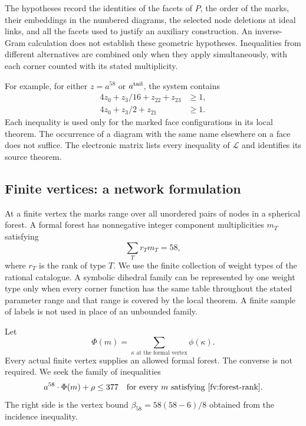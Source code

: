 \documentclass[11pt]{article}
\theoremstyle{definition}
\theoremstyle{remark}
\numberwithin{equation}{section}
\begin{document}
The hypotheses record the identities of the facets of $P$, the order
of the marks, their embeddings in the numbered diagrams, the selected
node deletions at ideal links, and all the facets used to justify an
auxiliary construction. An inverse-Gram calculation does not establish
these geometric hypotheses. Inequalities from different alternatives
are combined only when they apply simultaneously, with each corner
counted with its stated multiplicity.

For example, for either $z=a^{58}$ or $a^{\rm tail}$, the system
contains
\begin{align}
 4z_0+z_3/16+z_{22}+z_{23}&\ge1,
       \label{fv:example-face-P}\\
 4z_0+z_3/2+z_{21}&\ge1.
       \label{fv:example-face-M}
\end{align}
Each inequality is used only for the marked face configurations in
its local theorem. The occurrence of a diagram with the same name
elsewhere on a face does not suffice. The electronic matrix lists
every inequality of $\mathcal L$ and identifies its source theorem.

\subsection{Finite vertices: a network formulation}
\label{fv:finite-network}

At a finite vertex the marks range over all unordered pairs of
nodes in a spherical forest. A formal forest has nonnegative integer
component multiplicities $m_T$ satisfying
\begin{equation}\label{fv:forest-rank}
                  \sum_T r_Tm_T=58,
\end{equation}
where $r_T$ is the rank of type $T$. We use the finite collection of
weight types of the rational catalogue. A symbolic dihedral family
can be represented by one weight type only when every corner
function has the same table throughout the stated parameter range and that
range is covered by the local theorem. A finite sample of labels is
not used in place of an unbounded family.

Let
\[
 \Phi(m)=\sum_{\kappa\text{ at the formal vertex}}\phi(\kappa).
\]
Every actual finite vertex supplies an allowed formal forest. The
converse is not required. We seek the family of inequalities
\begin{equation}\label{fv:finite-budget-endpoint}
                   a^{58}\cdot\Phi(m)+\rho\le377
                  \quad\hbox{for every }m\text{ satisfying
                  \eqref{fv:forest-rank}}.
\end{equation}
The right side is the vertex bound
$\beta_{58}=58(58-6)/8$ obtained from the incidence inequality.
\end{document}
